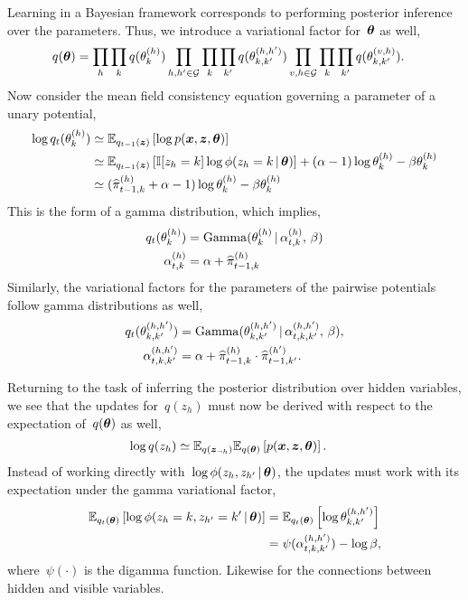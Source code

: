 Learning in a Bayesian framework corresponds to performing posterior
inference over the parameters. Thus, we introduce a variational factor
for~$\boldsymbol{\theta}$ as well,
\begin{align}
  q(\boldsymbol{\theta}) &=
  \prod_{h}\prod_{k} q(\theta_{k}^{(h)})
  \prod_{h,h' \in \mathcal{G}} \prod_{k} \prod_{k'} q(\theta_{k,k'}^{(h,h')})
  \prod_{v,h \in \mathcal{G}} \prod_{k} \prod_{k'} q(\theta_{k,k'}^{(v,h)} ).
\end{align}
Now consider the mean field consistency equation governing a parameter
of a unary potential,
\begin{align}
  \log q_t(\theta_k^{(h)}) &\simeq
  \mathbb{E}_{q_{t-1}(\boldsymbol{z})}\left[ \log p(\boldsymbol{x}, \boldsymbol{z}, \boldsymbol{\theta}) \right] \\
  &\simeq \mathbb{E}_{q_{t-1}(\boldsymbol{z})} \left[\mathbb{I}[z_h=k] \log \phi(z_h=k \,|\, \boldsymbol{\theta})\right]
  + (\alpha-1) \log \theta_k^{(h)} - \beta \theta_k^{(h)} \\
  &\simeq  (\widehat{\pi}_{t-1,k}^{(h)} + \alpha-1) \log \theta_k^{(h)}
  - \beta \theta_k^{(h)}
\end{align}
This is the form of a gamma distribution, which implies,
\begin{align}
  q_t(\theta_k^{(h)})
  &= \mathrm{Gamma}(\theta_k^{(h)} \,|\,  \alpha_{t,k}^{(h)}, \, \beta) \\
  \alpha_{t,k}^{(h)} &= \alpha + \widehat{\pi}_{t-1,k}^{(h)}
\end{align}
Similarly, the variational factors for the parameters of the pairwise
potentials follow gamma distributions as well,
\begin{align}
  q_t(\theta_{k,k'}^{(h,h')}) &=
  \mathrm{Gamma}(\theta_{k,k'}^{(h,h')} \,|\,
  \alpha_{t,k,k'}^{(h,h')},
  \, \beta), \\
  \alpha_{t,k,k'}^{(h,h')} &= \alpha + \widehat{\pi}_{t-1,k}^{(h)} \cdot \widehat{\pi}_{t-1,k'}^{(h')}.
\end{align}

Returning to the task of inferring the posterior distribution over
hidden variables, we see that the updates for~$q(z_h)$ must now
be derived with respect to the expectation of~$q(\boldsymbol{\theta})$ as well,
\begin{align}
  \log q(z_h) &\simeq \mathbb{E}_{q(\boldsymbol{z}_{\neg h})} \mathbb{E}_{q(\boldsymbol{\theta})} \left[ p(\boldsymbol{x}, \boldsymbol{z}, \boldsymbol{\theta}) \right].
\end{align}
Instead of working directly with~$\log \phi(z_h, z_{h'} \,|\, \boldsymbol{\theta})$,
the updates must work with its expectation under the gamma
variational factor,
\begin{align}
  \mathbb{E}_{q_t(\boldsymbol{\theta})} \left[\log \phi(z_h=k, z_{h'}=k' \,|\, \boldsymbol{\theta})\right]
  &= \mathbb{E}_{q_t(\boldsymbol{\theta})} \left[\log \theta_{k,k'}^{(h,h')} \right] \\
  \label{eq:expected_log_theta}
  &= \psi(\alpha_{t,k,k'}^{(h,h')}) - \log \beta,
\end{align}
where~$\psi(\cdot)$ is the digamma function. Likewise for the connections
between hidden and visible variables.

